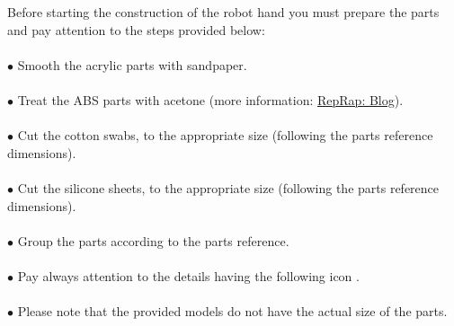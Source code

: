Before starting the construction of the robot hand you must prepare the parts and pay attention to the steps provided below: \\  \\
$\bullet$ Smooth the acrylic parts with sandpaper. \\ \\
$\bullet$ Treat the ABS parts with acetone (more information: \href{http://blog.reprap.org/2013/02/vapor-treating-abs-rp-parts.html}{RepRap: Blog}).\\ \\
$\bullet$ Cut the cotton swabs, to the appropriate size (following the parts reference dimensions). \\ \\
$\bullet$ Cut the silicone sheets, to the appropriate size (following the parts reference dimensions). \\ \\
$\bullet$ Group the parts according to the parts reference. \\ \\
$\bullet$ Pay always attention to the details having the following icon \Circled{!}.\\ \\
$\bullet$ Please note that the provided models do not have the actual size of the parts.\\ \\

\begin{center}
%
\end{center}